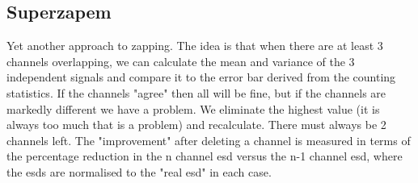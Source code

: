 \documentclass[10pt,a4paper,notitlepage]{article}
\begin{document}
\subsection{Superzapem}
Yet another approach to zapping. The idea is that when there are at least
3 channels overlapping, we can calculate the mean and variance of the 3
independent signals and compare it to the error bar derived from the counting
statistics. If the channels "agree" then all will be fine, but if the channels
are markedly different we have a problem. We eliminate the highest value (it
is always too much that is a problem) and recalculate. There must always be
2 channels left. The "improvement" after deleting a channel is measured in
terms of the percentage reduction in the n channel esd versus the n-1 channel
esd, where the esds are normalised to the "real esd" in each case.
\end{document}
